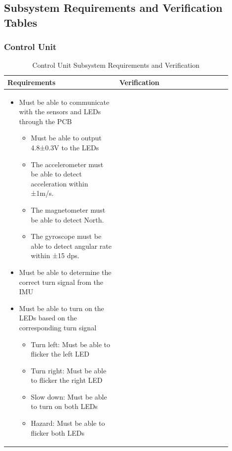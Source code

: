 \section{} \label{appendix:a}

\subsection{Subsystem Requirements and Verification Tables} \label{appendix:a:subsystemreqs}

\subsubsection{Control Unit}
\begin{table}[ht]
    \centering
    \caption{Control Unit Subsystem Requirements and Verification}
    \begin{tabular}{p{0.45\linewidth}p{0.45\linewidth}}
    \toprule
    \textbf{Requirements} & \textbf{Verification} \\
    \midrule
    \begin{itemize}[leftmargin=*, nosep, after=\strut]
        \item Must be able to communicate with the sensors and LEDs through the PCB
        \begin{itemize}[nosep]
            \item Must be able to output 4.8±0.3V to the LEDs
            \item The accelerometer must be able to detect acceleration within ±1m/s.
            \item The magnetometer must be able to detect North.
            \item The gyroscope must be able to detect angular rate within ±15 dps.
        \end{itemize}
        \item Must be able to determine the correct turn signal from the IMU
        \item Must be able to turn on the LEDs based on the corresponding turn signal
        \begin{itemize}[nosep]
            \item Turn left: Must be able to flicker the left LED
            \item Turn right: Must be able to flicker the right LED
            \item Slow down: Must be able to turn on both LEDs
            \item Hazard: Must be able to flicker both LEDs

\end{itemize}
\end{itemize}
\end{tabular}
\end{table}
